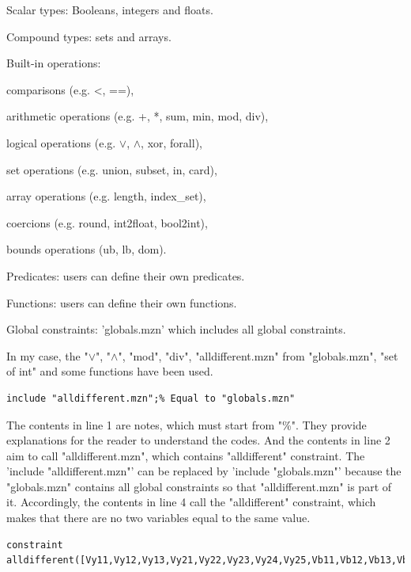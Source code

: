 \begin{compactenum}
  \item Scalar types: Booleans, integers and floats.
  \item Compound types: sets and arrays.
  \item Built-in operations: 
  \begin{compactitem}
  \item comparisons (e.g. <, ==),
  \item arithmetic operations (e.g. +, *, sum, min, mod, div),
  \item logical operations (e.g. $\vee$, $\wedge$, xor, forall),
  \item set operations (e.g. union, subset, in, card),
  \item array operations (e.g. length, index\_set),
  \item coercions (e.g. round, int2float, bool2int), 
  \item bounds operations (ub, lb, dom).
  \end{compactitem}
  \item Predicates: users can define their own predicates.
  \item Functions: users can define their own functions.
  \item Global constraints: 'globals.mzn' which includes all global constraints.
\end{compactenum}
In my case, the "$\vee$", "$\wedge$", "mod", "div", "alldifferent.mzn" from "globals.mzn", "set of int" and some functions have been used.
\begin{lstlisting}[language=minizinc,firstnumber=1]
% A simple Minizinc example 
include "alldifferent.mzn";% Equal to "globals.mzn"
\end{lstlisting}
The contents in line 1 are notes, which must start from "\%". They provide explanations for the reader to understand the codes. And the contents in line 2 aim to call "alldifferent.mzn", which contains "alldifferent" constraint. The 'include "alldifferent.mzn"' can be replaced by 'include "globals.mzn"' because the "globals.mzn" contains all global constraints so that "alldifferent.mzn" is part of it. Accordingly, the contents in line 4 call the "alldifferent" constraint, which makes that there are no two variables equal to the same value. 
\begin{lstlisting}[language=minizinc,firstnumber=3]
%all the Vunits are different
constraint alldifferent([Vy11,Vy12,Vy13,Vy21,Vy22,Vy23,Vy24,Vy25,Vb11,Vb12,Vb13,Vb14,Vb15,Vb21,Vb22,Vb23,Vb24,Vg11,Vg12,Vg13,Vg14,Vg21,Vg22,Vg23,Vr11,Vr12,Vr13,Vr14,Vr21,Vr22,Vr23,Vr24]);
\end{lstlisting}
